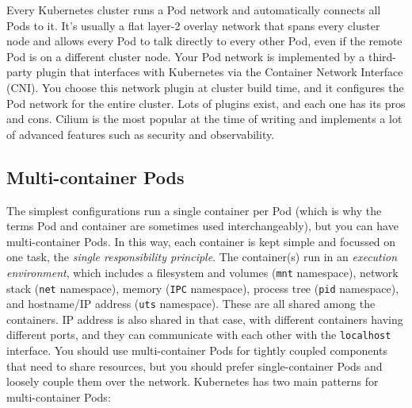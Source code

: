 \documentclass[8pt, table, xcdraw]{article}%
\begin{document}
Every Kubernetes cluster runs a Pod network and automatically connects all Pods to it. It’s usually a flat layer-2 overlay network that spans every cluster node and allows every Pod to talk directly to every other Pod, even if the remote Pod is on a different cluster node. Your Pod network is implemented by a third-party plugin that interfaces with Kubernetes via the Container Network Interface (CNI). You choose this network plugin at cluster build time, and it configures the Pod network for the entire cluster. Lots of plugins exist, and each one has its pros and cons. Cilium is the most popular at the time of writing and implements a lot of advanced features such as security and observability.

\subsection{Multi-container Pods}

The simplest configurations run a single container per Pod (which is why the terms Pod and container are sometimes used interchangeably), but you can have multi-container Pods. In this way, each container is kept simple and focussed on one task, the \emph{single responsibility principle}. The container(s) run in an \emph{execution environment}, which includes a filesystem and volumes (\lstinline{mnt} namespace), network stack (\lstinline{net} namespace), memory (\lstinline{IPC} namespace), process tree (\lstinline{pid} namespace), and hostname/IP address (\lstinline{uts} namespace). These are all shared among the containers. IP address is also shared in that case, with different containers having different ports, and they can communicate with each other with the \lstinline{localhost} interface. You should use multi-container Pods for tightly coupled components that need to share resources, but you should prefer single-container Pods and loosely couple them over the network. Kubernetes has two main patterns for multi-container Pods:
\end{document}

